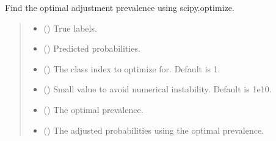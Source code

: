 \documentclass[letterpaper,10pt,english]{sphinxmanual}
\begin{document}
\begin{fulllineitems}
\label{\detokenize{calzone:calzone.utils.find_optimal_prevalence}}
\pysigstartsignatures
{}
\pysigstopsignatures
\sphinxAtStartPar
Find the optimal adjustment prevalence using scipy.optimize.
\begin{quote}\begin{description}
\begin{itemize}
\item {} 
\sphinxAtStartPar
{} () \textendash{} True labels.

\item {} 
\sphinxAtStartPar
{} () \textendash{} Predicted probabilities.

\item {} 
\sphinxAtStartPar
{} () \textendash{} The class index to optimize for. Default is 1.

\item {} 
\sphinxAtStartPar
{} () \textendash{} Small value to avoid numerical instability. Default is 1e\sphinxhyphen{}10.

\end{itemize}

\begin{itemize}
\item {} 
\sphinxAtStartPar
{} () \textendash{} The optimal prevalence.

\item {} 
\sphinxAtStartPar
{} () \textendash{} The adjusted probabilities using the optimal prevalence.

\end{itemize}

\end{description}\end{quote}

\end{fulllineitems}
\end{document}
